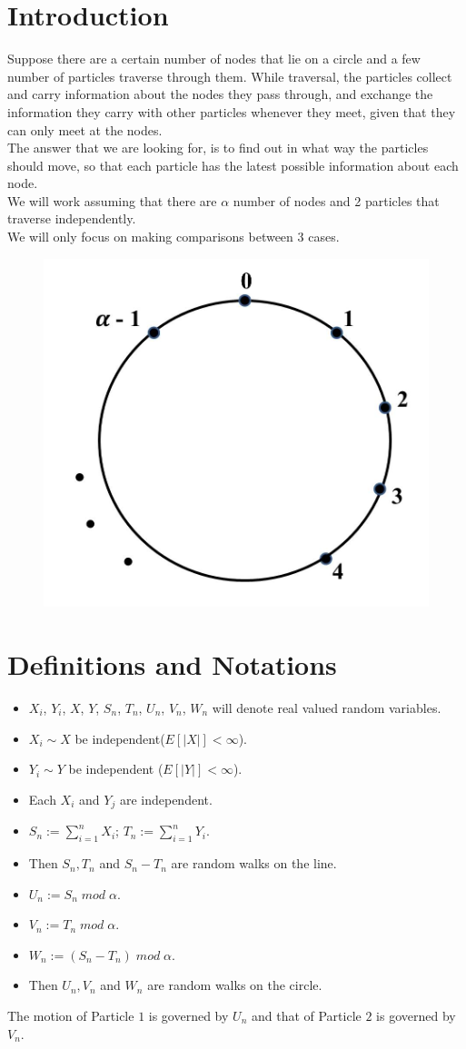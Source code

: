\documentclass[11pt]{article}
\begin{document}
	
	
	
	\section{Introduction}
	Suppose there are a certain number of nodes that lie on a circle and a few number of particles traverse through them. While traversal, the particles collect and carry information about the nodes they pass through, and exchange the information they carry with other particles whenever they meet, given that they can only meet at the nodes.\\
	The answer that we are looking for, is to find out in what way the particles should move, so that each particle has the latest possible information about each node.\\[1mm]
	We will work assuming that there are $\alpha$ number of nodes and 2 particles that traverse independently.\\[1mm]
	We will only focus on making comparisons between 3 cases.
	\begin{figure}[h!]
		\includegraphics[width=0.40 \columnwidth]{pic1}
		\centering
	\end{figure}
	\section{Definitions and Notations}
	\begin{itemize}
		\item  $X_i$, $Y_i$, $X$, $Y$, $S_n$, $T_n$, $U_n$, $V_n$, $W_n$ will denote real valued random variables.
		\item  $X_i \sim X$ be independent($E[|X|]<\infty$).
		\item $Y_i \sim Y$ be independent ($E[|Y|]<\infty$).
		\item Each $X_i$ and $Y_j$ are independent.
		\item $S_n := \sum_{i=1}^{n} X_i$; $T_n := \sum_{i=1}^{n} Y_i$.
		\item Then $S_n, T_n$ and $S_n - T_n$ are random walks on the line.
		\item $U_n := S_n \; mod \; \alpha$.
		\item  $V_n := T_n \; mod \; \alpha$.
		\item $W_n := (S_n - T_n )\; mod \; \alpha$.
		\item Then $U_n, V_n$ and $W_n$ are random walks on the circle.
	\end{itemize}
	The motion of Particle $1$ is governed by $U_n$ and that of Particle $2$ is governed by $V_n$.
\end{document}
